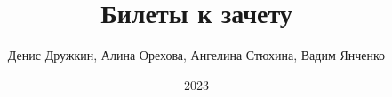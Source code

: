 \documentclass{Exams}
\author{Денис Дружкин, Алина Орехова, Ангелина Стюхина, Вадим Янченко}
\title{Билеты к зачету}
\date{2023}
\begin{document}
\subject{Алгем}
\ExamMakeTitle
\end{document}
